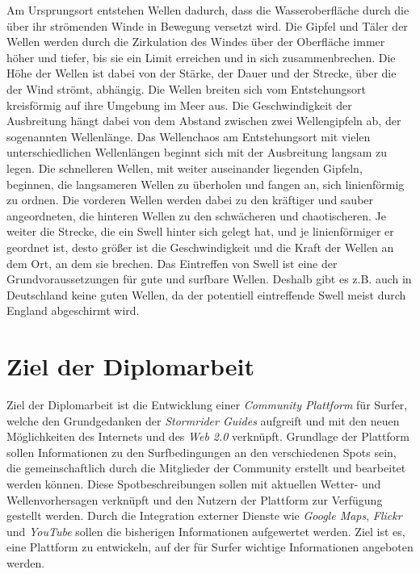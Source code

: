 Am Ursprungsort entstehen Wellen dadurch, dass die Wasseroberfläche
durch die über ihr strömenden Winde in Bewegung versetzt wird. Die
Gipfel und Täler der Wellen werden durch die Zirkulation des Windes
über der Oberfläche immer höher und tiefer, bis sie ein Limit
erreichen und in sich zusammenbrechen. Die Höhe der Wellen ist dabei
von der Stärke, der Dauer und der Strecke, über die der Wind strömt,
abhängig. Die Wellen breiten sich vom Entstehungsort kreisförmig auf
ihre Umgebung im Meer aus. Die Geschwindigkeit der Ausbreitung hängt
dabei von dem Abstand zwischen zwei Wellengipfeln ab, der sogenannten
Wellenlänge. Das Wellenchaos am Entstehungsort mit vielen
unterschiedlichen Wellenlängen beginnt sich mit der Ausbreitung
langsam zu legen. Die schnelleren Wellen, mit weiter auseinander
liegenden Gipfeln, beginnen, die langsameren Wellen zu überholen und
fangen an, sich linienförmig zu ordnen. Die vorderen Wellen werden
dabei zu den kräftiger und sauber angeordneten, die hinteren Wellen zu
den schwächeren und chaotischeren. Je weiter die Strecke, die ein
Swell hinter sich gelegt hat, und je linienförmiger er geordnet ist,
desto größer ist die Geschwindigkeit und die Kraft der Wellen an dem
Ort, an dem sie brechen. Das Eintreffen von Swell ist eine der
Grundvoraussetzungen für gute und surfbare Wellen. Deshalb gibt es
z.B. auch in Deutschland keine guten Wellen, da der potentiell
eintreffende Swell meist durch England abgeschirmt wird.

\section{Ziel der Diplomarbeit}
Ziel der Diplomarbeit ist die Entwicklung einer \textit{Community
  Plattform} für Surfer, welche den Grundgedanken der
\textit{Stormrider Guides} aufgreift und mit den neuen Möglichkeiten
des Internets und des \textit{Web 2.0} verknüpft. Grundlage der
Plattform sollen Informationen zu den Surfbedingungen an den
verschiedenen Spots sein, die gemeinschaftlich durch die Mitglieder
der Community erstellt und bearbeitet werden können. Diese
Spotbeschreibungen sollen mit aktuellen Wetter- und Wellenvorhersagen
verknüpft und den Nutzern der Plattform zur Verfügung gestellt
werden. Durch die Integration externer Dienste wie \textit{Google
  Maps}, \textit{Flickr} und \textit{YouTube} sollen die bisherigen
Informationen aufgewertet werden. Ziel ist es, eine Plattform zu
entwickeln, auf der für Surfer wichtige Informationen angeboten
werden.

